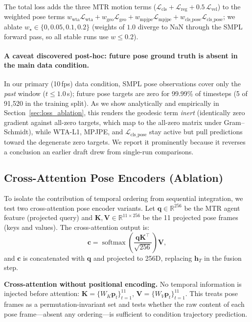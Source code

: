 \documentclass{article} %
\begin{document}
The total loss adds the three MTR motion terms ($\mathcal{L}_{\text{cls}} +
\mathcal{L}_{\text{reg}} + 0.5\,\mathcal{L}_{\text{vel}}$) to the weighted pose
terms $w_{\text{wta}}\mathcal{L}_{\text{wta}} + w_{\text{geo}}\mathcal{L}_{\text{geo}}
+ w_{\text{mpjpe}}\mathcal{L}_{\text{mpjpe}} + w_{\text{cls\_pose}}\mathcal{L}_{\text{cls\_pose}}$;
we ablate $w_\star \in \{0, 0.05, 0.1, 0.2\}$ (weights of $1.0$ diverge to NaN
through the SMPL forward pass, so all stable runs use $w \leq 0.2$).

\paragraph{A caveat discovered post-hoc: future pose ground truth is absent in the main data condition.}
\label{par:inert}
In our primary (10\,fps) data condition, SMPL pose observations cover only the
\emph{past} window ($t \leq 1.0$\,s); future pose targets are zero for 99.99\% of
timesteps (5 of 91{,}520 in the training split). As we show analytically and
empirically in Section~\ref{sec:loss_ablation}, this renders the geodesic term
\emph{inert} (identically zero gradient against all-zero targets, which map to the
all-zero matrix under Gram--Schmidt), while WTA-L1, MPJPE, and
$\mathcal{L}_{\text{cls\_pose}}$ stay active but pull predictions toward the
degenerate zero targets. We report it prominently because it reverses a conclusion
an earlier draft drew from single-run comparisons.

\subsection{Cross-Attention Pose Encoders (Ablation)}
\label{sec:cross_attn}

To isolate the contribution of temporal ordering from sequential integration, we
test two cross-attention pose encoder variants. Let $\mathbf{q} \in \mathbb{R}^{256}$
be the MTR agent feature (projected query) and $\mathbf{K}, \mathbf{V} \in \mathbb{R}^{11 \times 256}$
be the 11 projected pose frames (keys and values). The cross-attention output is:
\begin{equation}
  \mathbf{c} = \operatorname{softmax}\!\left(\frac{\mathbf{q}\mathbf{K}^\top}{\sqrt{256}}\right)\mathbf{V},
\end{equation}
and $\mathbf{c}$ is concatenated with $\mathbf{q}$ and projected to 256D, replacing $\mathbf{h}_T$ in the fusion step.

\textbf{Cross-attention without positional encoding.} No temporal information is injected before attention:
$\mathbf{K} = \{W_K \mathbf{p}_t\}_{t=1}^{11}$, $\mathbf{V} = \{W_V \mathbf{p}_t\}_{t=1}^{11}$.
This treats pose frames as a permutation-invariant set and tests whether the
raw content of each pose frame---absent any ordering---is sufficient to condition
trajectory prediction.
\end{document}
